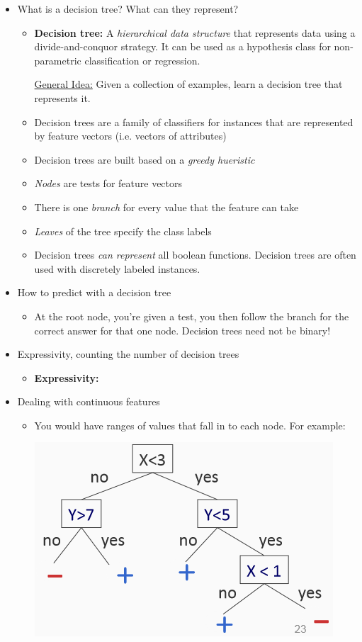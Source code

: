 \documentclass{article}
\begin{document}
\hspace{-1.5em}{\large \bf Decision Trees}
\begin{itemize}
\item What is a decision tree? What can they represent?
	\begin{itemize}
	\item {\bf Decision tree:} A {\em hierarchical data structure} that represents data using a divide-and-conquor strategy. It can be used as a hypothesis class for non-parametric classification or regression. 

	\underline{General Idea:} Given a collection of examples, learn a decision tree that represents it.
	\item Decision trees are a family of classifiers for instances that are represented by feature vectors (i.e. vectors of attributes)
	\item Decision trees are built based on a {\em greedy hueristic}
	\item {\em Nodes} are tests for feature vectors
	\item There is one {\em branch} for every value that the feature can take
	\item {\em Leaves} of the tree specify the class labels
	\item Decision trees {\em can represent} all boolean functions. Decision trees are often used with discretely labeled instances. 
	\end{itemize}
\item How to predict with a decision tree
	\begin{itemize}
	\item At the root node, you're given a test, you then follow the branch for the correct answer for that one node. Decision trees need not be binary!
	\end{itemize}
\item Expressivity, counting the number of decision trees
	\begin{itemize}
	\item {\bf Expressivity:} 
	\end{itemize}
\item Dealing with continuous features
	\begin{itemize}
	\item You would have ranges of values that fall in to each node. For example:
	\begin{center}
	\includegraphics[width=.3\textwidth]{continuous.png}

\end{center}
\end{itemize}
\end{itemize}
\end{document}
